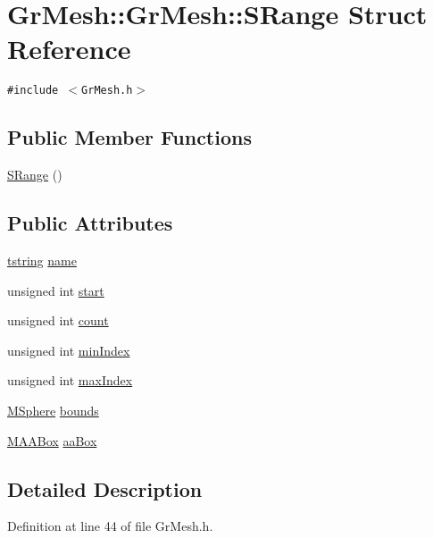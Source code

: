 \hypertarget{struct_gr_mesh_1_1_s_range}{
\section{GrMesh::GrMesh::SRange Struct Reference}
\label{struct_gr_mesh_1_1_s_range}
}
{\tt \#include $<$GrMesh.h$>$}

\subsection*{Public Member Functions}
\begin{CompactItemize}
\item 
\hyperlink{struct_gr_mesh_1_1_s_range_9b2b1d5ee9adae30d34994240453dfb2}{SRange} ()
\end{CompactItemize}
\subsection*{Public Attributes}
\begin{CompactItemize}
\item 
\hyperlink{common__afx_8h_816fa58fd77499b0edb2c69ebe803d5c}{tstring} \hyperlink{struct_gr_mesh_1_1_s_range_332525f7e1ef670c14bd59cd8b47a34f}{name}
\item 
unsigned int \hyperlink{struct_gr_mesh_1_1_s_range_baaa840da5e956fb1b9c1750a0c8928f}{start}
\item 
unsigned int \hyperlink{struct_gr_mesh_1_1_s_range_6431490fa0589e30eb3eef84b21352c5}{count}
\item 
unsigned int \hyperlink{struct_gr_mesh_1_1_s_range_63e71ca2a50a27fa4c6b95ebfd7472f4}{minIndex}
\item 
unsigned int \hyperlink{struct_gr_mesh_1_1_s_range_7e44b7370e15a3faaea7669107d2f4cd}{maxIndex}
\item 
\hyperlink{class_m_sphere}{MSphere} \hyperlink{struct_gr_mesh_1_1_s_range_7c2fe272192a5165a0f3c6b854ba83d1}{bounds}
\item 
\hyperlink{class_m_a_a_box}{MAABox} \hyperlink{struct_gr_mesh_1_1_s_range_6f515e5181e2803d43e7e2bc36bdb430}{aaBox}
\end{CompactItemize}


\subsection{Detailed Description}


Definition at line 44 of file GrMesh.h.

